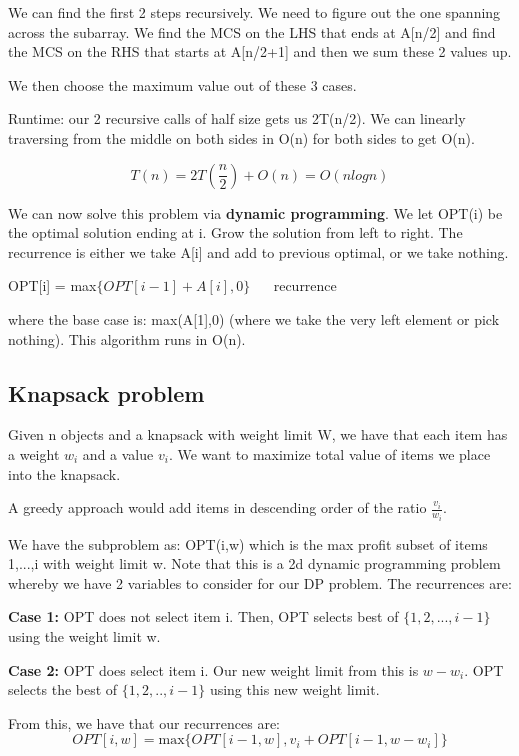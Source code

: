 \documentclass[11pt, oneside]{article}
\theoremstyle{definition}
\begin{document}
We can find the first 2 steps recursively. We need to figure out the one spanning across the subarray. We find the MCS on the LHS that ends at A[n/2] and find the MCS on the RHS that starts at A[n/2+1] and then we sum these 2 values up.

We then choose the maximum value out of these 3 cases.

Runtime: our 2 recursive calls of half size gets us 2T(n/2). We can linearly traversing from the middle on both sides in O(n) for both sides to get O(n).

$$
T(n) = 2T(\frac{n}{2}) + O(n) = O(nlogn)
$$

We can now solve this problem via \textbf{dynamic programming}. We let OPT(i) be the optimal solution ending at i. Grow the solution from left to right. The recurrence is either we take A[i] and add to previous optimal, or we take nothing.
\begin{center}
  OPT[i] = max$\{OPT[i-1] + A[i],0\}$ $\quad$ recurrence
\end{center}
where the base case is: max(A[1],0) (where we take the very left element or pick nothing). This algorithm runs in O(n).

\subsection{Knapsack problem}
Given n objects and a knapsack with weight limit W, we have that each item has a weight $w_i$ and a value $v_i$. We want to maximize total value of items we place into the knapsack.

A greedy approach would add items in descending order of the ratio $\frac{v_i}{w_i}$.

We have the subproblem as: OPT(i,w) which is the max profit subset of items 1,...,i with weight limit w. Note that this is a 2d dynamic programming problem whereby we have 2 variables to consider for our DP problem. The recurrences are:
\begin{center}
  \textbf{Case 1:} OPT does not select item i. Then, OPT selects best of $\{1,2,...,i-1\}$ using the weight limit w.

  \textbf{Case 2:} OPT does select item i. Our new weight limit from this is $w - w_i$. OPT selects the best of $\{1,2,..,i-1\}$ using this new weight limit.
\end{center}

From this, we have that our recurrences are:
$$
OPT[i,w] = \text{max}\{OPT[i-1,w], v_i + OPT[i-1,w-w_i]\}
$$
\end{document}
